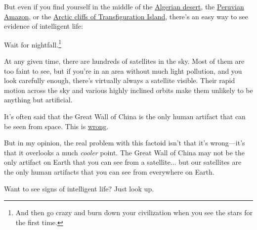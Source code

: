 {{But even if you find yourself in the middle of the \href{http://www.panoramio.com/photo\_explorer\#view=photo&position=51&with\_photo\_id=33928392&order=date\_desc&user=4349822}{Algerian desert}, the \href{http://www.panoramio.com/photo\_explorer\#view=photo&position=4&with\_photo\_id=3285987&order=date\_desc&user=36948}{Peruvian Amazon}, or the \href{http://www.panoramio.com/photo\_explorer\#view=photo&position=108&with\_photo\_id=10214089&order=date\_desc&user=1567433} {Arctic cliffs of Transfiguration Island}, there's an easy way to see evidence of intelligent life:}

{Wait for nightfall.{\footnote{And then go crazy and burn down your civilization when you see the stars for the first time.} } }

{At any given time, there are hundreds of satellites in the sky. Most of them are too faint to see, but if you're in an area without much light pollution, and you look carefully enough, there's virtually always a satellite visible. Their rapid motion across the sky and various highly inclined orbits make them unlikely to be anything but artificial.}

{It's often said that the Great Wall of China is the only human artifact that can be seen from space. This is \href{http://www.universetoday.com/25364/can-you-see-the-great-wall-of-china-from-space/}{wrong}.}

{But in my opinion, the real problem with this factoid isn't that it's wrong—it's that it overlooks a much \emph{cooler} point. The Great Wall of China may not be the only artifact on Earth that you can see from a satellite... but our satellites are the only human artifacts that you can see from everywhere on Earth.}

{Want to see signs of intelligent life? Just look up.}

}
